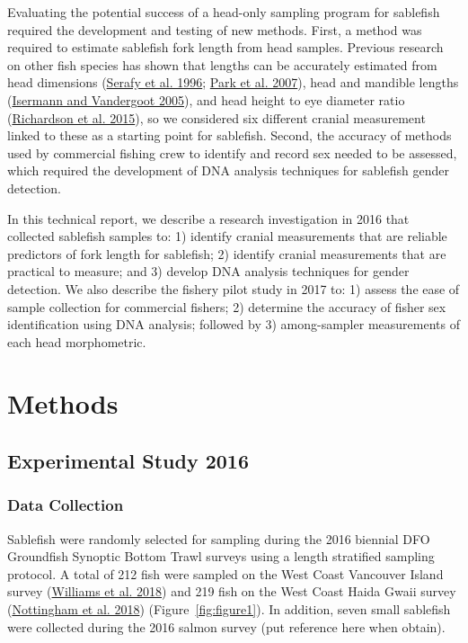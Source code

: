 \documentclass[12pt]{article}\usepackage[]{graphicx}\usepackage[]{color}
\begin{document}
Evaluating the potential success of a head-only sampling program for sablefish required the development and testing of new methods. First, a method was required to estimate sablefish fork length from head samples. Previous research on other fish species has shown that lengths can be accurately estimated from head dimensions (\protect\hyperlink{ref-Serafy1996}{Serafy et al. 1996}; \protect\hyperlink{ref-Park2007}{Park et al. 2007}), head and mandible lengths (\protect\hyperlink{ref-Isermann2005}{Isermann and Vandergoot 2005}), and head height to eye diameter ratio (\protect\hyperlink{ref-Richardson2015}{Richardson et al. 2015}), so we considered six different cranial measurement linked to these as a starting point for sablefish. Second, the accuracy of methods used by commercial fishing crew to identify and record sex needed to be assessed, which required the development of DNA analysis techniques for sablefish gender detection.

In this technical report, we describe a research investigation in 2016 that collected sablefish samples to: 1) identify cranial measurements that are reliable predictors of fork length for sablefish; 2) identify cranial measurements that are practical to measure; and 3) develop DNA analysis techniques for gender detection. We also describe the fishery pilot study in 2017 to: 1) assess the ease of sample collection for commercial fishers; 2) determine the accuracy of fisher sex identification using DNA analysis; followed by 3) among-sampler measurements of each head morphometric.

\clearpage

\hypertarget{methods}{%
\section{Methods}\label{methods}}

\hypertarget{experimental-study-2016}{%
\subsection{Experimental Study 2016}\label{experimental-study-2016}}

\hypertarget{data-collection}{%
\subsubsection{Data Collection}\label{data-collection}}

Sablefish were randomly selected for sampling during the 2016 biennial DFO Groundfish Synoptic Bottom Trawl surveys using a length stratified sampling protocol. A total of 212 fish were sampled on the West Coast Vancouver Island survey (\protect\hyperlink{ref-Williams2018}{Williams et al. 2018}) and 219 fish on the West Coast Haida Gwaii survey (\protect\hyperlink{ref-Nottingham2018}{Nottingham et al. 2018}) (Figure~\ref{fig:figure1}). In addition, seven small sablefish were collected during the 2016 salmon survey (put reference here when obtain).
\end{document}
